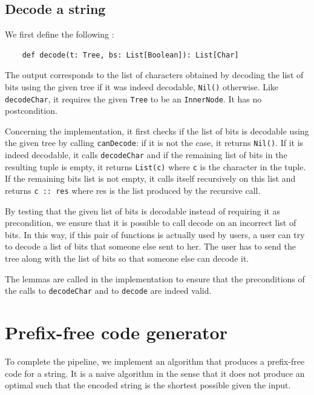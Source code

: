\documentclass[a4paper,UKenglish,cleveref, autoref, thm-restate]{lipics-v2021}
\begin{document}
\subsection{Decode a string}
We first define the following :

\begin{lstlisting}
    def decode(t: Tree, bs: List[Boolean]): List[Char]
\end{lstlisting}

The output corresponds to the list of characters obtained by decoding the list of bits using the given tree if it was indeed decodable, \lstinline{Nil()} otherwise.
Like \lstinline{decodeChar}, it requires the given \lstinline{Tree} to be an \lstinline{InnerNode}. It has no postcondition. 

Concerning the implementation, it first checks if the list of bits is decodable using the given tree by calling \lstinline{canDecode}: if it is not the case, it returns \lstinline{Nil()}. 
If it is indeed decodable, it calls \lstinline{decodeChar} and if the remaining list of bits in the resulting tuple is empty, it returns \lstinline{List(c)} where \lstinline{c} is the character in the tuple. If the remaining bits list is not empty,
it calls itself recursively on this list and returns \lstinline{c :: res} where res is the list produced by the recursive call.

By testing that the given list of bits is decodable instead of requiring it as precondition, we ensure that it is possible to call decode on an incorrect list of bits. 
In this way, if this pair of functions is actually used by users, a user can try to decode a list of bits that someone else sent to her. The user has to send the tree along with the list of bits so that someone else can decode it.

The lemmas are called in the implementation to ensure that the preconditions of the calls to \lstinline{decodeChar} and to \lstinline{decode} are indeed valid.

\section{Prefix-free code generator} 
To complete the pipeline, we implement an algorithm that produces a prefix-free code for a string. It is a naive algorithm in the sense that it does not produce an optimal such that the encoded string is the shortest possible given the input.
\end{document}
